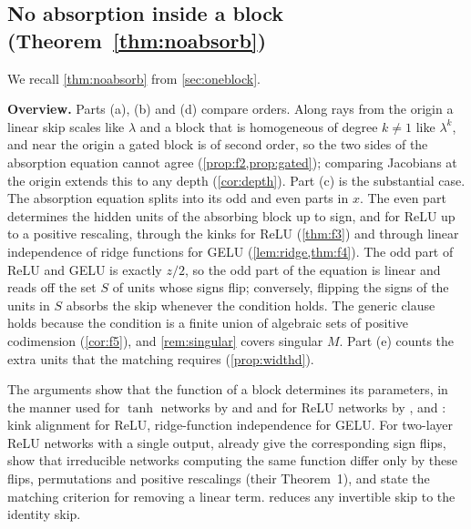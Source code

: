 \documentclass[10pt]{article}
\theoremstyle{definition}
\theoremstyle{remark}
\newcommand{\para}[1]{\smallskip\noindent\textbf{#1}\hspace{0.5em}}
\begin{document}
\subsection{No absorption inside a block\texorpdfstring{ (Theorem~\ref*{thm:noabsorb})}{}}\label{app:absorb}

We recall \cref{thm:noabsorb} from \cref{sec:oneblock}.
\thmNoAbsorb*

\para{Overview.} Parts (a), (b) and (d) compare orders. Along rays from the origin a linear skip scales like $\lambda$ and a block that is homogeneous of degree $k \neq 1$ like $\lambda^k$, and near the origin a gated block is of second order, so the two sides of the absorption equation cannot agree (\cref{prop:f2,prop:gated}); comparing Jacobians at the origin extends this to any depth (\cref{cor:depth}). Part (c) is the substantial case. The absorption equation splits into its odd and even parts in $x$. The even part determines the hidden units of the absorbing block up to sign, and for ReLU up to a positive rescaling, through the kinks for ReLU (\cref{thm:f3}) and through linear independence of ridge functions for GELU (\cref{lem:ridge,thm:f4}). The odd part of ReLU and GELU is exactly $z/2$, so the odd part of the equation is linear and reads off the set $S$ of units whose signs flip; conversely, flipping the signs of the units in $S$ absorbs the skip whenever the condition holds. The generic clause holds because the condition is a finite union of algebraic sets of positive codimension (\cref{cor:f5}), and \cref{rem:singular} covers singular $M$. Part (e) counts the extra units that the matching requires (\cref{prop:widthd}).

The arguments show that the function of a block determines its parameters, in the manner used for $\tanh$ networks by \citet{sussmann1992} and \citet{fefferman1994} and for ReLU networks by \citet{buithimai2020functional}, \citet{petzka2020symmetries} and \citet{rolnick2020reverse}: kink alignment for ReLU, ridge-function independence for GELU. For two-layer ReLU networks with a single output, \citet[Section~3]{petzka2020symmetries} already give the corresponding sign flips, show that irreducible networks computing the same function differ only by these flips, permutations and positive rescalings (their Theorem~1), and state the matching criterion for removing a linear term.  reduces any invertible skip to the identity skip.
\end{document}
